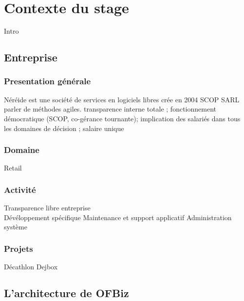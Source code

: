 \chapter{Contexte du stage}

Intro

\section{Entreprise}

\subsection{Presentation générale }
Néréide est une société de services en logiciels libres crée en 2004  SCOP SARL \\
parler de méthodes agiles. 
transparence interne totale ;
fonctionnement démocratique (SCOP, co-gérance tournante);
implication des salariés dans tous les domaines de décision ;
salaire unique


























\subsection{Domaine}
Retail
\subsection{Activité}
\label{activite}
Transparence libre entreprise \\


Dévéloppement spécifique 
Maintenance et support applicatif
Administration système
\subsection{Projets}
Décathlon
Dejbox







\newpage
\section{L'architecture de OFBiz}
